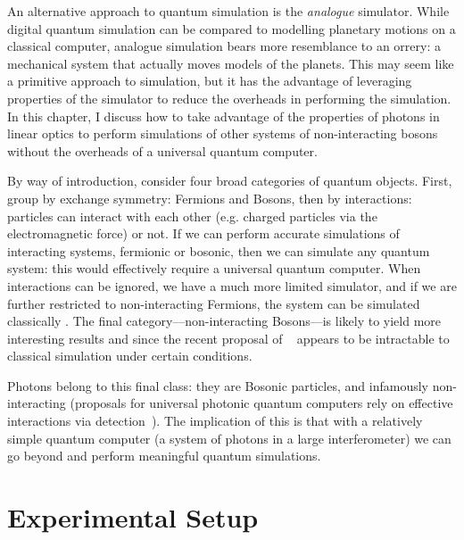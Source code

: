 An alternative approach to quantum simulation is the \emph{analogue} simulator.
While digital quantum simulation can be compared to modelling planetary motions
on a classical computer, analogue simulation bears more resemblance to an
orrery: a mechanical system that actually moves models of the planets. This may
seem like a primitive approach to simulation, but it has the advantage of
leveraging properties of the simulator to reduce the overheads in performing the
simulation. In this chapter, I discuss how to take advantage of the properties
of photons in linear optics to perform simulations of other systems of
non-interacting bosons without the overheads of a universal quantum computer.

By way of introduction, consider four broad categories of quantum objects.
First, group by exchange symmetry: Fermions and Bosons, then by interactions:
particles can interact with each other (e.g. charged particles via the
electromagnetic force) or not. If we can perform accurate simulations of
interacting systems, fermionic or bosonic, then we can simulate any quantum
system: this would effectively require a universal quantum computer. When
interactions can be ignored, we have a much more limited simulator, and if we
are further restricted to non-interacting Fermions, the system can be simulated
classically . The final category---non-interacting
Bosons---is likely to yield more interesting results and since the recent
proposal of \bosonsampling{}~\cite{bosonsampling} appears to be intractable to
classical simulation under certain conditions.

Photons belong to this final class: they are Bosonic particles, and infamously
non-interacting (proposals for universal photonic quantum computers rely on
effective interactions via detection~\cite{klm}). The implication of this is
that with a relatively simple quantum computer (a system of photons in a large
interferometer) we can go beyond \bosonsampling{} and perform meaningful quantum
simulations.

\section{Experimental Setup}
